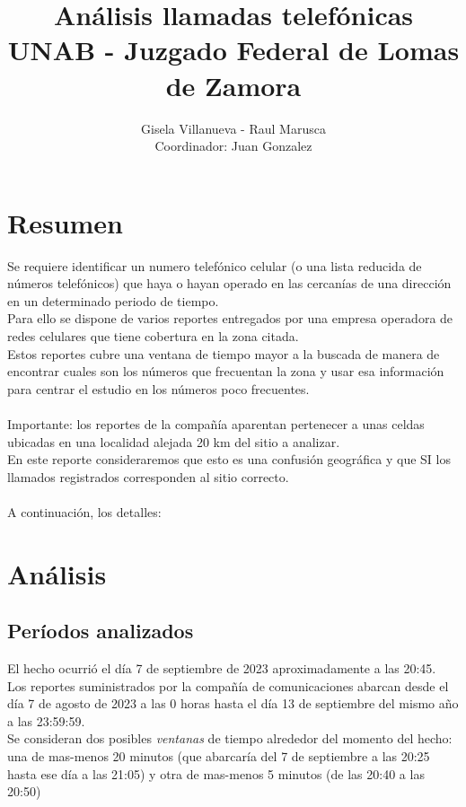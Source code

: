 \documentclass[12pt]{report}
\author{Gisela Villanueva - Raul Marusca\\Coordinador: Juan Gonzalez}
\title{\huge Análisis llamadas telefónicas\\{\Large UNAB - Juzgado Federal de Lomas de Zamora}}
\begin{document}
	\maketitle
	
	\chapter*{Resumen}
	Se requiere identificar un numero telefónico celular (o una lista reducida de números telefónicos) que haya o hayan  operado en las cercanías de una dirección en un determinado periodo de tiempo.\\
	Para ello se dispone de varios reportes entregados por una empresa operadora de redes celulares que tiene cobertura en la zona citada.\\
	Estos reportes cubre una ventana de tiempo mayor a la buscada de manera de encontrar cuales son los números que frecuentan la zona y usar esa información para centrar el estudio en los números poco frecuentes.\\
	\vspace{3mm}\\
	{\Large Importante:} los reportes de la compañía aparentan pertenecer a unas celdas ubicadas en una localidad alejada 20 km del sitio a analizar.\\
	En este reporte consideraremos que esto es una confusión geográfica y que SI los llamados registrados corresponden al sitio correcto.\\
	\vspace{3mm}\\
	A continuación, los detalles:
	
	\chapter*{Análisis}
	\section*{Períodos analizados}
	El hecho ocurrió el día 7 de septiembre de 2023 aproximadamente a las 20:45.\\
	Los reportes suministrados por la compañía de comunicaciones abarcan desde el día 7 de agosto de 2023 a las 0 horas hasta el día 13 de septiembre del mismo año a las 23:59:59.\\
	Se consideran dos posibles \textit{ventanas} de tiempo alrededor del momento del hecho: una de mas-menos 20 minutos (que abarcaría del 7 de septiembre a las 20:25 hasta ese día a las 21:05) y otra de mas-menos 5 minutos (de las 20:40 a las 20:50)
\end{document}
